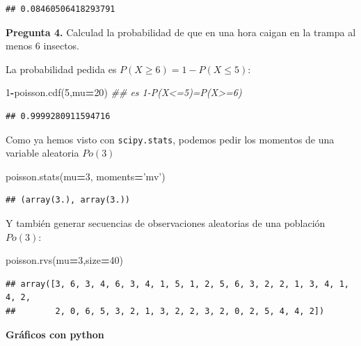 \documentclass[]{book}
\newenvironment{Shaded}{\begin{snugshade}}{\end{snugshade}}
\newcommand{\CommentTok}[1]{\textcolor[rgb]{0.56,0.35,0.01}{\textit{#1}}}
\newcommand{\DecValTok}[1]{\textcolor[rgb]{0.00,0.00,0.81}{#1}}
\newcommand{\NormalTok}[1]{#1}
\newcommand{\OperatorTok}[1]{\textcolor[rgb]{0.81,0.36,0.00}{\textbf{#1}}}
\newcommand{\StringTok}[1]{\textcolor[rgb]{0.31,0.60,0.02}{#1}}
\begin{document}
\begin{verbatim}
## 0.08460506418293791
\end{verbatim}

\textbf{Pregunta 4.} Calculad la probabilidad de que en una hora caigan en la trampa al menos 6 insectos.

La probabilidad pedida es \(P(X\geq 6)=1-P(X\leq 5)\):

\begin{Shaded}
\begin{Highlighting}[]
\DecValTok{1}\OperatorTok{-}\NormalTok{poisson.cdf(}\DecValTok{5}\NormalTok{,mu}\OperatorTok{=}\DecValTok{20}\NormalTok{) }
\CommentTok{## es 1-P(X<=5)=P(X>=6)}
\end{Highlighting}
\end{Shaded}

\begin{verbatim}
## 0.9999280911594716
\end{verbatim}

Como ya hemos visto con \texttt{scipy.stats}, podemos pedir los momentos de una variable aleatoria
\(Po(3)\)

\begin{Shaded}
\begin{Highlighting}[]
\NormalTok{poisson.stats(mu}\OperatorTok{=}\DecValTok{3}\NormalTok{, moments}\OperatorTok{=}\StringTok{'mv'}\NormalTok{)}
\end{Highlighting}
\end{Shaded}

\begin{verbatim}
## (array(3.), array(3.))
\end{verbatim}

Y también generar secuencias de observaciones aleatorias de una población \(Po(3)\):

\begin{Shaded}
\begin{Highlighting}[]
\NormalTok{poisson.rvs(mu}\OperatorTok{=}\DecValTok{3}\NormalTok{,size}\OperatorTok{=}\DecValTok{40}\NormalTok{)}
\end{Highlighting}
\end{Shaded}

\begin{verbatim}
## array([3, 6, 3, 4, 6, 3, 4, 1, 5, 1, 2, 5, 6, 3, 2, 2, 1, 3, 4, 1, 4, 2,
##        2, 0, 6, 5, 3, 2, 1, 3, 2, 2, 3, 2, 0, 2, 5, 4, 4, 2])
\end{verbatim}

\textbf{Gráficos con python}
\end{document}
